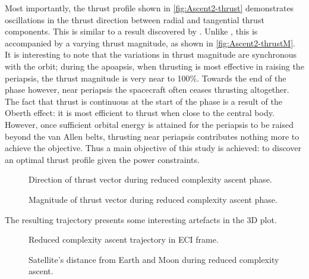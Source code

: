 Most importantly, the thrust profile shown in \autoref{fig:Ascent2-thrust} demonstrates oscillations in the thrust direction between radial and tangential thrust components. This is similar to a result discovered by \textcite{Betts2003}. Unlike \textcite{Betts2003}, this is accompanied by a varying thrust magnitude, as shown in \autoref{fig:Ascent2-thrustM}. It is interesting to note that the variations in thrust magnitude are synchronous with the orbit; during the apoapsis, when thrusting is most effective in raising the periapsis, the thrust magnitude is very near to 100\%. Towards the end of the phase however, near periapsis the spacecraft often ceases thrusting altogether. The fact that thrust is continuous at the start of the phase is a result of the Oberth effect: it is most efficient to thrust when close to the central body. However, once sufficient orbital energy is attained for the periapsis to be raised beyond the van Allen belts, thrusting near periapsis contributes nothing more to achieve the objective. Thus a main objective of this study is achieved: to discover an optimal thrust profile given the power constraints.

\begin{figure}
\centering
\def\svgwidth{\figurewidth}

\caption{Direction of thrust vector during reduced complexity ascent phase.}
\label{fig:Ascent2-thrust}
\end{figure}

\begin{figure}
\centering
\def\svgwidth{\figurewidth}

\caption{Magnitude of thrust vector during reduced complexity ascent phase.}
\label{fig:Ascent2-thrustM}
\end{figure}

The resulting trajectory presents some interesting artefacts in the 3D plot. 

\begin{figure}
\centering
\def\svgwidth{\figurewidth}

\caption{Reduced complexity ascent trajectory in ECI frame.}
\label{fig:Ascent2-3D}
\end{figure}

\begin{figure}
\centering
\def\svgwidth{\figurewidth}

\caption{Satellite's distance from Earth and Moon during reduced complexity ascent.}
\label{fig:Ascent2-dist}
\end{figure}

